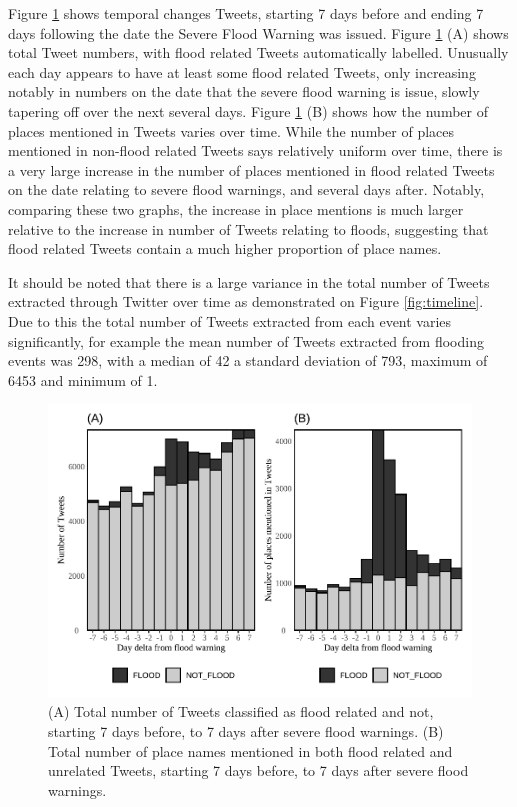 \documentclass[a4paper, notitlepage]{extreport}
\begin{document}
Figure \ref{fig:dailychange} shows temporal changes Tweets, starting 7
days before and ending 7 days following the date the Severe Flood
Warning was issued. Figure \ref{fig:dailychange} (A) shows total Tweet
numbers, with flood related Tweets automatically labelled. Unusually
each day appears to have at least some flood related Tweets, only
increasing notably in numbers on the date that the severe flood warning
is issue, slowly tapering off over the next several days. Figure
\ref{fig:dailychange} (B) shows how the number of places mentioned in
Tweets varies over time. While the number of places mentioned in
non-flood related Tweets says relatively uniform over time, there is a
very large increase in the number of places mentioned in flood related
Tweets on the date relating to severe flood warnings, and several days
after. Notably, comparing these two graphs, the increase in place
mentions is much larger relative to the increase in number of Tweets
relating to floods, suggesting that flood related Tweets contain a much
higher proportion of place names.

It should be noted that there is a large variance in the total number of
Tweets extracted through Twitter over time as demonstrated on Figure
\ref{fig:timeline}. Due to this the total number of Tweets extracted
from each event varies significantly, for example the mean number of
Tweets extracted from flooding events was 298, with a median of 42 a
standard deviation of 793, maximum of 6453 and minimum of 1.

\begin{figure}[tb]

{\centering \includegraphics[width=.75\linewidth]{index_files/figure-latex/dailychange-1} 

}

\caption{(A) Total number of Tweets classified as flood related and not, starting 7 days before, to 7 days after severe flood warnings. (B) Total number of place names mentioned in both flood related and unrelated Tweets, starting 7 days before, to 7 days after severe flood warnings.}\label{fig:dailychange}
\end{figure}
\end{document}
